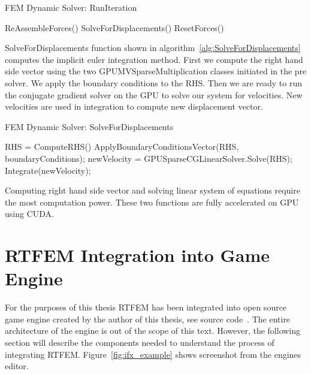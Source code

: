 \documentclass[en]{minipw} %
\begin{document}
\begin{algorithm}
\caption{FEM Dynamic Solver: RunIteration}
\label{alg:RunIteration}
\begin{algorithmic}[1]
\State ReAssembleForces()
\State SolveForDisplacements()
\State ResetForces()
\EndProcedure
\end{algorithmic}
\end{algorithm}

SolveForDisplacements function shown in algorithm~\ref{alg:SolveForDisplacements} computes the implicit euler integration method. First we compute the right hand side vector using the two GPUMVSparseMultiplication classes initiated in the pre solver. We apply the boundary conditions to the RHS. Then we are ready to run the conjugate gradient solver on the GPU to solve our system for velocities. New velocities are used in integration to compute new displacement vector.

\begin{algorithm}
\caption{FEM Dynamic Solver: SolveForDisplacements}
\label{alg:SolveForDisplacements}
\begin{algorithmic}[1]
\State RHS = ComputeRHS()
\State ApplyBoundaryConditionsVector(RHS, boundaryConditions);
\State newVelocity = GPUSparseCGLinearSolver.Solve(RHS);
\State Integrate(newVelocity);
\EndProcedure
\end{algorithmic}
\end{algorithm}

Computing right hand side vector and solving linear system of equations require the most computation power. These two functions are fully accelerated on GPU using CUDA.

\section{RTFEM Integration into Game Engine}
For the purposes of this thesis RTFEM has been integrated into open source game engine created by the author of this thesis, see source code~\cite{ifx}. The entire architecture of the engine is out of the scope of this text. However, the following section will describe the components needed to understand the process of integrating RTFEM. Figure~\ref{fig:ifx_example} shows screenshot from the engines editor.
\end{document}
